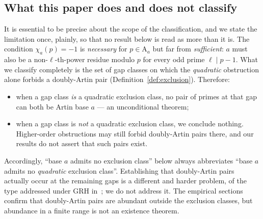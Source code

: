 \documentclass[11pt,reqno]{amsart}
\theoremstyle{plain}
\theoremstyle{definition}
\newcommand{\Art}{\mathrm{A}}
\begin{document}
\subsection*{What this paper does and does not classify}
It is essential to be precise about the scope of the classification, and we
state the limitation once, plainly, so that no result below is read as more
than it is. The condition $\chi_a(p) = -1$ is \emph{necessary} for $p \in
\Art_a$ but far from \emph{sufficient}: $a$ must also be a non-$\ell$-th-power
residue modulo $p$ for every odd prime $\ell \mid p-1$. What we classify
completely is the set of gap classes on which the \emph{quadratic} obstruction
alone forbids a doubly-Artin pair (Definition~\ref{def:exclusion}). Therefore:

\begin{itemize}
\item when a gap class \emph{is} a quadratic exclusion class, no pair of primes
      at that gap can both be Artin base $a$ --- an unconditional theorem;
\item when a gap class is \emph{not} a quadratic exclusion class, we conclude
      nothing. Higher-order obstructions may still forbid doubly-Artin pairs
      there, and our results do not assert that such pairs exist.
\end{itemize}

Accordingly, ``base $a$ admits no exclusion class'' below always abbreviates
``base $a$ admits no \emph{quadratic} exclusion class''. Establishing that
doubly-Artin pairs actually occur at the remaining gaps is a different and
harder problem, of the type addressed under GRH in~\cite{Pollack2014}; we do
not address it. The empirical sections confirm that doubly-Artin pairs are
abundant outside the exclusion classes, but abundance in a finite range is not
an existence theorem.
\end{document}
